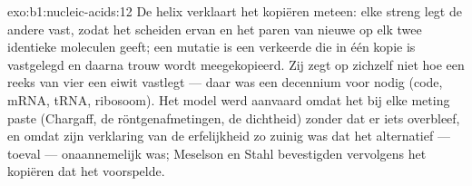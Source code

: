 \begin{solution}{exo:b1:nucleic-acids:12}
De helix verklaart het kopiëren meteen: elke streng legt de andere vast, zodat
het scheiden ervan en het paren van nieuwe  op elk twee identieke
moleculen geeft; een mutatie is een verkeerde  die in één kopie is vastgelegd
en daarna trouw wordt meegekopieerd. Zij zegt op zichzelf niet hoe een reeks van
vier  een eiwit vastlegt --- daar was een decennium voor nodig (code, mRNA,
tRNA, ribosoom). Het model werd aanvaard omdat het bij elke meting paste
(Chargaff, de röntgenafmetingen, de dichtheid) zonder dat er iets overbleef, en
omdat zijn verklaring van de erfelijkheid zo zuinig was dat het alternatief ---
toeval --- onaannemelijk was; Meselson en Stahl bevestigden vervolgens het
kopiëren dat het voorspelde.
\end{solution}

